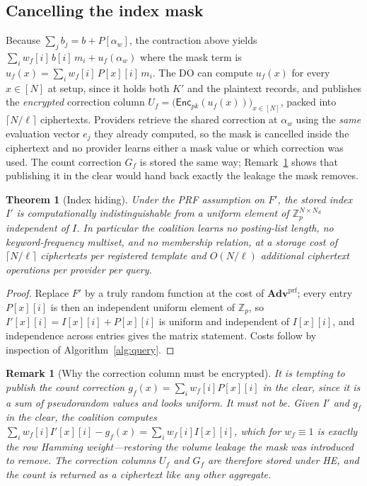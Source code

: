 \documentclass[journal]{IEEEtran}
\newtheorem{theorem}{Theorem}
\newtheorem{remark}{Remark}
\newcommand{\Enc}{\mathsf{Enc}}
\newcommand{\advPRF}{\mathbf{Adv}^{\mathrm{prf}}}
\begin{document}
\subsection{Cancelling the index mask}
\label{sec:mask}
Because $\sum_j b_j = b + P[\alpha_w]$, the contraction above yields $\sum_{i} w_f[i]\,b[i]\,m_i + u_f(\alpha_w)$ where the mask term is
$u_f(x)=\sum_{i} w_f[i]\,P[x][i]\,m_i$.
The DO can compute $u_f(x)$ for every $x\in[N]$ at setup, since it holds both $K'$ and the plaintext records, and publishes the \emph{encrypted} correction column $U_f = \big(\Enc_{pk}(u_f(x))\big)_{x\in[N]}$, packed into $\lceil N/\ell\rceil$ ciphertexts. Providers retrieve the shared correction at $\alpha_w$ using the \emph{same} evaluation vector $e_j$ they already computed, so the mask is cancelled inside the ciphertext and no provider learns either a mask value or which correction was used. The count correction $G_f$ is stored the same way; Remark~\ref{rem:whyenc} shows that publishing it in the clear would hand back exactly the leakage the mask removes.

\begin{theorem}[Index hiding]
\label{thm:mask}
Under the PRF assumption on $F'$, the stored index $I'$ is computationally indistinguishable from a uniform element of $\mathbb{Z}_p^{N\times N_d}$ independent of $I$. In particular the coalition learns no posting-list length, no keyword-frequency multiset, and no membership relation, at a storage cost of $\lceil N/\ell\rceil$ ciphertexts per registered template and $O(N/\ell)$ additional ciphertext operations per provider per query.
\end{theorem}
\begin{proof}
Replace $F'$ by a truly random function at the cost of $\advPRF$; every entry $P[x][i]$ is then an independent uniform element of $\mathbb{Z}_p$, so $I'[x][i]=I[x][i]+P[x][i]$ is uniform and independent of $I[x][i]$, and independence across entries gives the matrix statement. Costs follow by inspection of Algorithm~\ref{alg:query}.
\end{proof}

\begin{remark}[Why the correction column must be encrypted]
\label{rem:whyenc}
It is tempting to publish the count correction $g_f(x)=\sum_i w_f[i]P[x][i]$ in the clear, since it is a sum of pseudorandom values and looks uniform. It must not be. Given $I'$ and $g_f$ in the clear, the coalition computes $\sum_i w_f[i]I'[x][i]-g_f(x)=\sum_i w_f[i]I[x][i]$, which for $w_f\equiv 1$ is exactly the row Hamming weight---restoring the volume leakage the mask was introduced to remove. The correction columns $U_f$ and $G_f$ are therefore stored under HE, and the count is returned as a ciphertext like any other aggregate.
\end{remark}
\end{document}
